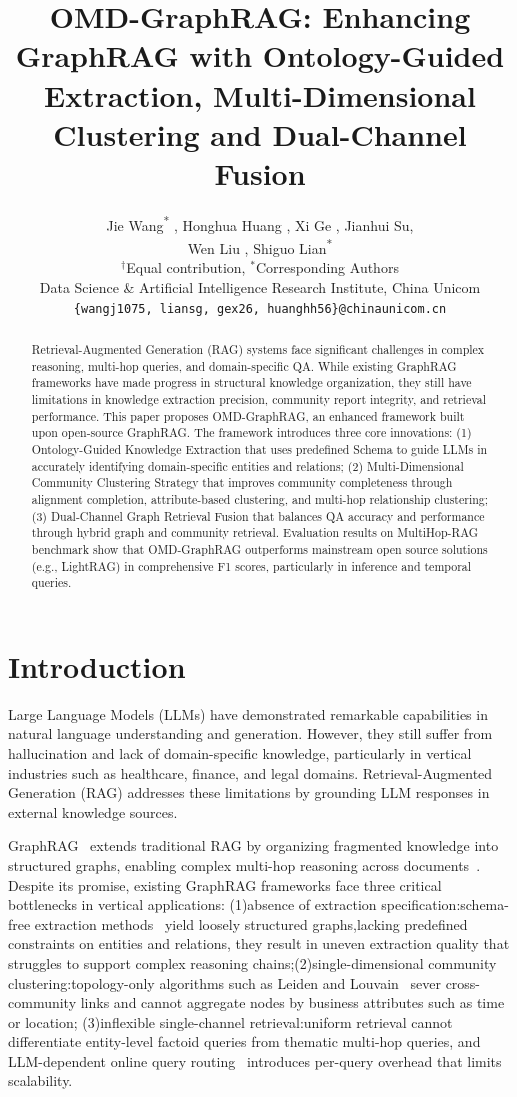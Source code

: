 \documentclass[11pt]{article}
\title{OMD-GraphRAG: Enhancing GraphRAG with Ontology-Guided Extraction, Multi-Dimensional Clustering and Dual-Channel Fusion}
\author{
Jie Wang\textsuperscript{\textdagger}\textsuperscript{*} ,
Honghua Huang\textsuperscript{\textdagger} ,
Xi Ge\textsuperscript{\textdagger} ,
Jianhui Su\textsuperscript{\textdagger}, \\
Wen Liu\textsuperscript{\textdagger} ,
Shiguo Lian\textsuperscript{\textdagger}\textsuperscript{*} \\
\small $^\dagger$Equal contribution, $^*$Corresponding Authors \\
Data Science \& Artificial Intelligence Research Institute, China Unicom \\
\texttt{\{wangj1075, liansg, gex26, huanghh56\}@chinaunicom.cn} \\
}
\begin{document}
\maketitle
\begin{abstract}
Retrieval-Augmented Generation (RAG) systems face significant challenges in complex reasoning, multi-hop queries, and domain-specific QA. While existing GraphRAG frameworks have made progress in structural knowledge organization, they still have limitations in knowledge extraction precision, community report integrity, and retrieval performance. This paper proposes OMD-GraphRAG, an enhanced framework built upon open-source GraphRAG. The framework introduces three core innovations: (1) Ontology-Guided Knowledge Extraction that uses predefined Schema to guide LLMs in accurately identifying domain-specific entities and relations; (2) Multi-Dimensional Community Clustering Strategy that improves community completeness through alignment completion, attribute-based clustering, and multi-hop relationship clustering; (3) Dual-Channel Graph Retrieval Fusion that balances QA accuracy and performance through hybrid graph and community retrieval. Evaluation results on MultiHop-RAG benchmark show that OMD-GraphRAG outperforms mainstream open source solutions (e.g., LightRAG) in comprehensive F1 scores, particularly in inference and temporal queries.
\end{abstract}

\section{Introduction}

Large Language Models (LLMs) have demonstrated remarkable capabilities in natural language understanding and generation. However, they still suffer from hallucination and lack of domain-specific knowledge, particularly in vertical industries such as healthcare, finance, and legal domains. Retrieval-Augmented Generation (RAG) addresses these limitations by grounding LLM responses in external knowledge sources.

GraphRAG~\citep{7} extends traditional RAG by organizing fragmented knowledge into structured graphs, enabling complex multi-hop reasoning across documents~\citep{2,3,8}. Despite its promise, existing GraphRAG frameworks face three critical bottlenecks in vertical applications: (1)absence of extraction specification:schema-free extraction methods~\citep{11} yield loosely structured graphs,lacking predefined constraints on entities and relations, they result in uneven extraction quality that struggles to support complex reasoning chains;(2)single-dimensional community clustering:topology-only algorithms such as Leiden and Louvain~\citep{6} sever cross-community links and cannot aggregate nodes by business attributes such as time or location;  (3)inflexible single-channel retrieval:uniform retrieval cannot differentiate entity-level factoid queries from thematic multi-hop queries, and LLM-dependent online query routing~\citep{16} introduces per-query overhead that limits scalability.
\end{document}
